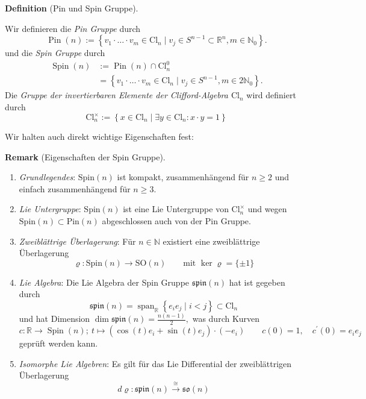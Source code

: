 \documentclass[10pt, letterpaper]{article}
\newcommand{\N}{\mathbb{N}}
\newcommand{\Cl}{\mathrm{Cl}}
\newcommand{\SO}{\mathrm{SO}}
\newcommand{\Spin}{\mathrm{Spin}}
\newcommand{\Pin}{\mathrm{Pin}}
\newcommand{\CustomHeading}[3]{%
  \par\medskip\noindent%
  \textbf{#1 #2} \textnormal{(#3)}.\enskip%
}
\newenvironment{DEF}[2]{\CustomHeading{Definition}{#1}{#2}}{}
\newenvironment{REM}[2]{\CustomHeading{Remark}{#1}{#2}}{}
\begin{document}
\begin{DEF}{}{Pin und Spin Gruppe}
Wir definieren die \emph{Pin Gruppe} durch
$$
\operatorname{Pin}(n):=\left\{v_1 \cdot \ldots \cdot v_m \in \mathrm{Cl}_n \mid v_j \in S^{n-1} \subset \mathbb{R}^n, m \in \mathbb{N}_0\right\} .
$$
und die \emph{Spin Gruppe} durch
$$
\begin{aligned}
\operatorname{Spin}(n) & :=\operatorname{Pin}(n) \cap \mathrm{Cl}_n^0 \\
& =\left\{v_1 \cdot \ldots \cdot v_m \in \mathrm{Cl}_n \mid v_j \in S^{n-1}, m \in 2 \mathbb{N}_0\right\} .
\end{aligned}
$$
Die \emph{Gruppe der invertierbaren Elemente der Clifford-Algebra $\Cl_n$} wird definiert durch
$$\mathrm{Cl}_n^{\times}:=\left\{x \in \mathrm{Cl}_n \mid \exists y \in \mathrm{Cl}_n: x \cdot y=1\right\}$$
\end{DEF}

\bigskip

Wir halten auch direkt wichtige Eigenschaften fest:


\begin{REM}{}{Eigenschaften der Spin Gruppe}
  \begin{enumerate}
    \item \emph{Grundlegendes}: $\Spin(n)$ ist kompakt, zusammenhängend für $n\geq 2$ und einfach zusammenhängend für $n\geq 3$.
    \item \emph{Lie Untergruppe}: $\Spin(n)$ ist eine Lie Untergruppe von $\Cl^\times_n$ und wegen $\Spin(n)\subset\Pin(n)$ abgeschlossen auch von der Pin Gruppe.
    \item \emph{Zweiblättrige Überlagerung}: Für $n\in\N$ existiert eine zweiblättrige Überlagerung 
    $$\varrho: \Spin(n)\to \SO(n) \qquad \text{mit } \ker{\varrho}=\{\pm 1\}$$
    \item \emph{Lie Algebra}: Die Lie Algebra der Spin Gruppe $\mathfrak{spin}(n)$ hat ist gegeben durch
    $$\mathfrak{spin}(n)=\operatorname{span}_{\mathbb{R}}\left\{e_i e_j \mid i<j\right\} \subset \mathrm{Cl}_n$$
    und hat Dimension $\dim \mathfrak{spin}(n)=\frac{n(n-1)}{2},$
    was durch Kurven 
    $$c: \mathbb{R} \rightarrow \operatorname{Spin}(n);\ t \mapsto\left(\cos (t) e_i+\sin (t) e_j\right) \cdot\left(-e_i\right) \qquad c(0)=1, \quad c^{\prime}(0)=e_i e_j$$
    geprüft werden kann.
    \item \emph{Isomorphe Lie Algebren}: Es gilt für das Lie Differential der zweiblättrigen Überlagerung
    $$d\varrho:\mathfrak{spin}(n)\overset{\cong}{\longrightarrow}\mathfrak{so}(n)$$
    
  \end{enumerate}
\end{REM}
\end{document}
